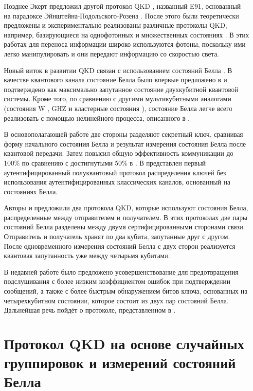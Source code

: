 \documentclass[a4paper,11pt]{article}
\begin{document}
Позднее Экерт предложил другой протокол QKD \cite{E91}, названный E91, основанный на парадоксе Эйнштейна-Подольского-Розена \cite{EPR}. После этого были теоретически предложены и экспериментально реализованы различные протоколы QKD, например, базирующиеся на однофотонных \cite{liang2015simple} и множественных состояниях \cite{fourstate}. В этих работах для переноса информации широко используются фотоны, поскольку ими легко манипулировать и они передают информацию со скоростью света.

Новый виток в развитии QKD связан с использованием состояний Белла \cite{EPR}.
В качестве квантового канала состояние Белла было впервые предложено в \cite{Gao} и подтверждено \cite{bellstatescomp} как максимально запутанное состояние двухкубитной квантовой системы. Кроме того, по сравнению с другими мультикубитными аналогами (состояния W \cite{W}, GHZ \cite{GHZ} и кластерные состояния \cite{cluster}), состояние Белла легче всего реализовать с помощью нелинейного процесса, описанного в  \cite{twophotons}. 

В основополагающей работе \cite{Gao} две стороны разделяют секретный ключ, сравнивая форму начального состояния Белла и результат измерения состояния Белла после квантовой передачи.
Затем \cite{nine} повысил общую эффективность коммуникации до 100\% по сравнению с достигнутыми 50\% в \cite{Gao}. В \cite{ten} представлен первый аутентифицированный полуквантовый протокол распределения ключей без использования аутентифицированных классических каналов, основанный на состояниях Белла.

Авторы \cite{Gao} и \cite{nine} предложили два протокола QKD, которые используют состояния Белла, распределенные между отправителем и получателем. В этих протоколах две пары состояний Белла разделены между двумя сертифицированными сторонами связи. Отправитель и получатель хранят по два кубита, запутанные друг с другом. После одновременного измерения состояний Белла с двух сторон реализуется квантовая запутанность уже между четырьмя кубитами.

В недавней работе \cite{base} было предложено усовершенствование \cite{nine} для предотвращения подслушивания с более низким коэффициентом ошибок при подтверждении сообщений, а также с более быстрым обнаружением битов ключа, основанных на четырехкубитном состоянии, которое состоит из двух пар состояний Белла. Дальнейшая речь пойдёт о протоколе, представленном в \cite{base}.

\section{Протокол QKD на основе случайных группировок и измерений состояний Белла}\label{proto}
\end{document}
